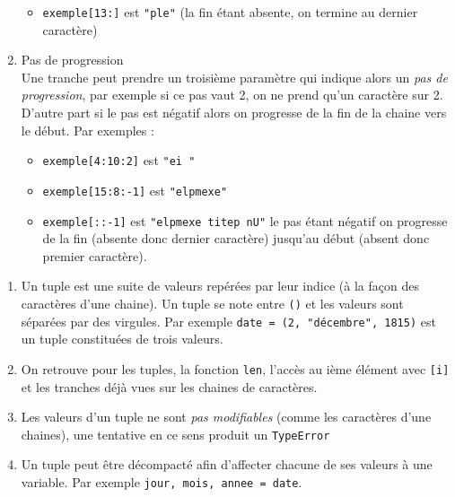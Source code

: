 \documentclass[11pt,a4paper]{article}
\begin{document}
\begin{tcolorbox}[left=0cm,title=\bf{\faPython \; Tranches},colbacktitle=cfond]
\begin{enumerate}
\begin{itemize}
  \item[\textbullet] \texttt{exemple[13:]} est {\tt "ple"} (la fin étant absente, on termine au dernier caractère)
 \end{itemize}	
\item[\ding{184}] Pas de progression \\
Une tranche peut prendre un troisième paramètre qui indique alors un \textit{pas de progression}, par exemple si ce pas vaut 2, on ne prend qu'un caractère sur 2. D'autre part si le pas est négatif alors on progresse de la fin de la chaine vers le début. Par exemples :
\begin{itemize}
    \item[\textbullet] \texttt{exemple[4:10:2]} est {\tt "ei "}
    \item[\textbullet] \texttt{exemple[15:8:-1]} est {\tt "elpmexe"} 
    \item[\textbullet] \texttt{exemple[::-1]} est {\tt "elpmexe titep nU"} le pas étant négatif on progresse de la fin (absente donc dernier caractère) jusqu'au début (absent donc premier caractère).
\end{itemize}	
\end{enumerate}
\end{tcolorbox}

\begin{tcolorbox}[left=0cm,title=\bf{\faPython \; Tuples},colbacktitle=cfond]
    \begin{enumerate}
        \item[\ding{182}] Un tuple est une suite de valeurs repérées par leur indice (à la façon des caractères d'une chaine). Un tuple se note entre {\tt ()} et les valeurs sont séparées par des virgules. Par exemple \texttt{date = (2, "décembre", 1815)} est un tuple constituées de trois valeurs.
        \item[\ding{183}] On retrouve pour les tuples, la fonction {\tt len}, l'accès au  ième élément avec {\tt [i]} et les tranches déjà vues sur les chaines de caractères.
        \item[\ding{184}] Les valeurs d'un tuple ne sont \textit{pas modifiables} (comme les caractères d'une chaines), une tentative en ce sens produit un {\tt TypeError}
        \item[\ding{185}] Un tuple peut être décompacté afin d'affecter chacune de ses valeurs à une variable. Par exemple \texttt{jour, mois, annee = date}.
    \end{enumerate}
\end{tcolorbox}
\end{document}
